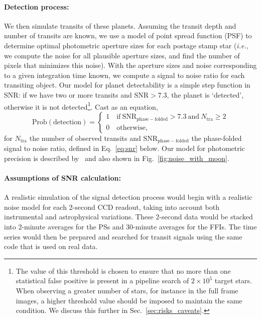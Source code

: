 \paragraph{Detection process:}
We then simulate transits of these planets.  Assuming the transit
depth and number of transits are known, we use a model of \tesss point
spread function (PSF) to determine optimal photometric aperture sizes
for each postage stamp star (\textit{i.e.,} we compute the noise for
all plausible aperture sizes, and find the number of pixels that
minimizes this noise).  With the aperture sizes and noise
corresponding to a given integration time known, we compute a signal
to noise ratio for each transiting object.  Our model for planet
detectability is a simple step function in SNR: if we have two or more
transits and $\text{SNR} > 7.3$, the planet is `detected', otherwise
it is not detected\footnote{The value of this threshold is chosen to
  ensure that no more than one statistical false positive is present in
  a pipeline search of $2\times10^5$ target stars. When observing a
  greater number of stars, for instance in the full frame images, 
  a higher threshold value should be imposed to maintain the same condition. We
  discuss this further in Sec.~\protect\ref{sec:risks_caveats}.}. 
Cast as an equation,
\begin{equation}
\mathrm{Prob(detection)}=\begin{cases}
1 \quad \mathrm{if\ SNR_{phase-folded}} > 7.3\ \mathrm{and}\ 
	N_\mathrm{tra} \geq 2 \\
0 \quad \mathrm{otherwise},
\end{cases}
\label{eq:detection_criterion}
\end{equation}
for $N_\mathrm{tra}$ the number of observed transits and 
$\mathrm{SNR_{phase-folded}}$ the phase-folded signal to noise ratio, defined 
in Eq.~\ref{eq:snr} below.
Our model for \tesss photometric precision is described 
by~ and also shown in
Fig.~\ref{fig:noise_with_moon}.

\paragraph{Assumptions of SNR calculation:}
A realistic simulation of the signal detection process
would begin with a realistic noise model for each 2-second CCD readout, taking into account both
instrumental and astrophysical variations. These 2-second data would be stacked into 2-minute
averages for the PSs and 30-minute averages for the FFIs. The time series would 
then be prepared and searched for transit signals using the same code that is 
used on real data.

